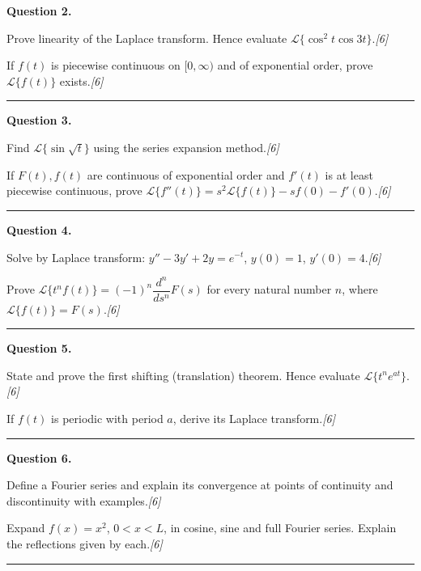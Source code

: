 \documentclass[11pt,a4paper]{article}
\newcommand{\pts}[1]{\hfill   \textit{[#1]}}
\begin{document}
\medskip


\noindent   \textbf{Question 2.}

\begin{parts}
  \item Prove linearity of the Laplace transform. Hence evaluate $\mathcal{L}\{\cos^2 t\cos 3t\}$.\pts{6}
  \item If $f(t)$ is piecewise continuous on $[0,\infty)$ and of exponential order, prove $\mathcal{L}\{f(t)\}$ exists.\pts{6}
\end{parts}
\medskip\rule{\linewidth}{0.2pt}

\medskip


\noindent   \textbf{Question 3.}

\begin{parts}
  \item Find $\mathcal{L}\{\sin\sqrt{t}\}$ using the series expansion method.\pts{6}
  \item If $F(t),f(t)$ are continuous of exponential order and $f'(t)$ is at least piecewise continuous, prove $\mathcal{L}\{f''(t)\}=s^2\mathcal{L}\{f(t)\}-sf(0)-f'(0)$.\pts{6}
\end{parts}
\medskip\rule{\linewidth}{0.2pt}

\medskip


\noindent   \textbf{Question 4.}

\begin{parts}
  \item Solve by Laplace transform: $y''-3y'+2y=e^{-t}$, $y(0)=1$, $y'(0)=4$.\pts{6}
  \item Prove $\mathcal{L}\{t^n f(t)\}=(-1)^n\dfrac{d^n}{ds^n}F(s)$ for every natural number $n$, where $\mathcal{L}\{f(t)\}=F(s)$.\pts{6}
\end{parts}
\medskip\rule{\linewidth}{0.2pt}

\medskip


\noindent   \textbf{Question 5.}

\begin{parts}
  \item State and prove the first shifting (translation) theorem. Hence evaluate $\mathcal{L}\{t^n e^{at}\}$.\pts{6}
  \item If $f(t)$ is periodic with period $a$, derive its Laplace transform.\pts{6}
\end{parts}
\medskip\rule{\linewidth}{0.2pt}

\medskip


\noindent   \textbf{Question 6.}

\begin{parts}
  \item Define a Fourier series and explain its convergence at points of continuity and discontinuity with examples.\pts{6}
  \item Expand $f(x)=x^2$, $0<x<L$, in cosine, sine and full Fourier series. Explain the reflections given by each.\pts{6}
\end{parts}
\medskip\rule{\linewidth}{0.2pt}
\end{document}
